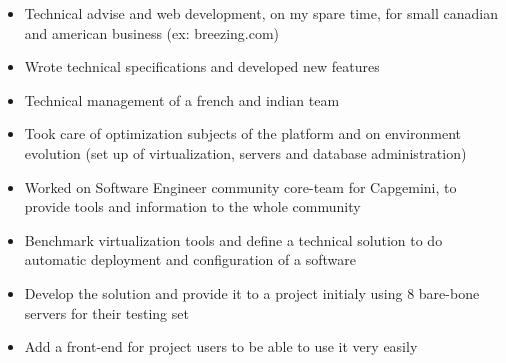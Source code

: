 \documentclass[10pt,a4paper,ragged2e]{src/altacv}
\begin{document}
\medskip\medskip\medskip\smallskip

\small
{}
\normalsize
\hspace{3em}  
\begin{itemize}
\item Technical advise and web development, on my spare time, for small canadian and american business (ex: breezing.com)
\end{itemize}

\divider



\small
{}
\normalsize
\hspace{3em}
\begin{itemize}
\item Wrote technical specifications and developed new features
\item Technical management of a french and indian team
\item Took care of optimization subjects of the platform and on environment evolution (set up of virtualization, servers and database administration)
\item Worked on Software Engineer community core-team for Capgemini, to provide tools and information to the whole community
\end{itemize}

\divider


\begin{itemize}
\item Benchmark virtualization tools and define a technical solution to do automatic deployment and configuration of a software
\item Develop the solution and provide it to a project initialy using 8 bare-bone servers for their testing set
\item Add a front-end for project users to be able to use it very easily
\end{itemize}
\end{document}
